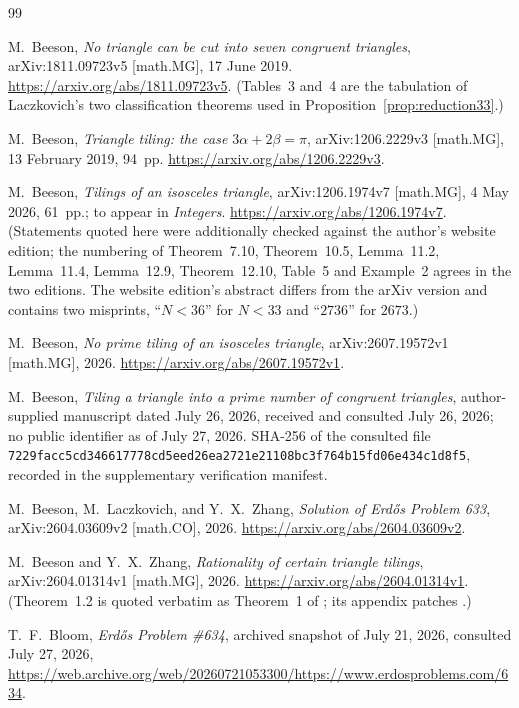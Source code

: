 \documentclass[11pt]{amsart}
\theoremstyle{definition}
\theoremstyle{remark}
\begin{document}
\begin{thebibliography}{99}

M.~Beeson,
\emph{No triangle can be cut into seven congruent triangles},
arXiv:1811.09723v5 [math.MG], 17 June 2019.
\url{https://arxiv.org/abs/1811.09723v5}.
(Tables~3 and~4 are the tabulation of Laczkovich's two classification
theorems used in Proposition~\ref{prop:reduction33}.)

M.~Beeson,
\emph{Triangle tiling: the case $3\alpha+2\beta=\pi$},
arXiv:1206.2229v3 [math.MG], 13 February 2019, 94~pp.
\url{https://arxiv.org/abs/1206.2229v3}.

M.~Beeson,
\emph{Tilings of an isosceles triangle},
arXiv:1206.1974v7 [math.MG], 4 May 2026, 61~pp.; to appear in
\emph{Integers}.
\url{https://arxiv.org/abs/1206.1974v7}.
(Statements quoted here were additionally checked against the author's
website edition; the numbering of Theorem~7.10, Theorem~10.5,
Lemma~11.2, Lemma~11.4, Lemma~12.9, Theorem~12.10, Table~5 and Example~2
agrees in the two editions.  The website edition's abstract differs from
the arXiv version and contains two misprints, ``$N<36$'' for $N<33$ and
``$2736$'' for $2673$.)

M.~Beeson,
\emph{No prime tiling of an isosceles triangle},
arXiv:2607.19572v1 [math.MG], 2026.
\url{https://arxiv.org/abs/2607.19572v1}.

M.~Beeson,
\emph{Tiling a triangle into a prime number of congruent triangles},
author-supplied manuscript dated July 26, 2026, received and consulted
July 26, 2026; no public identifier as of July 27, 2026.  SHA-256 of the
consulted file
\texttt{7229facc5cd346617778cd5eed26ea2721e21108bc3f764b15fd06e434c1d8f5},
recorded in the supplementary verification manifest.

M.~Beeson, M.~Laczkovich, and Y.~X.~Zhang,
\emph{Solution of Erd\H{o}s Problem 633},
arXiv:2604.03609v2 [math.CO], 2026.
\url{https://arxiv.org/abs/2604.03609v2}.

M.~Beeson and Y.~X.~Zhang,
\emph{Rationality of certain triangle tilings},
arXiv:2604.01314v1 [math.MG], 2026.
\url{https://arxiv.org/abs/2604.01314v1}.
(Theorem~1.2 is quoted verbatim as Theorem~1 of \cite{Zhang25}; its
appendix patches \cite[Lemma~7.1]{Lacz12}.)

T.~F.~Bloom,
\emph{Erd\H{o}s Problem \#634},
archived snapshot of July 21, 2026, consulted July 27, 2026,
\url{https://web.archive.org/web/20260721053300/https://www.erdosproblems.com/634}.


\end{thebibliography}
\end{document}
